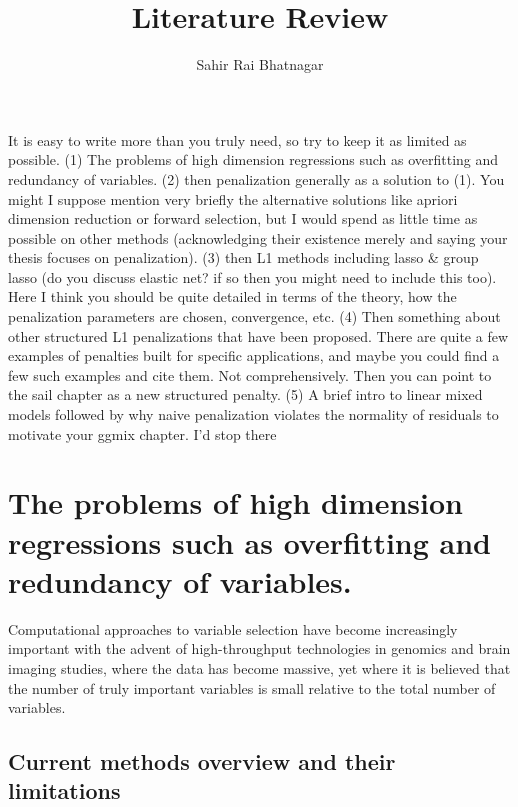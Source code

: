 \documentclass[12pt,letterpaper]{article}
\title{Literature Review}
\author{Sahir Rai Bhatnagar}
\begin{document}
\maketitle
	
It is easy to write more than you truly need, so try to keep it as limited as possible.  
(1) The problems of high dimension regressions such as overfitting and redundancy of variables.  
(2) then  penalization generally as a solution to (1).  
You might I suppose mention very briefly the alternative solutions like apriori dimension reduction or forward selection, but I would spend as little time as possible on other methods (acknowledging their existence merely and saying your thesis focuses on penalization).  
(3) then L1 methods including lasso \& group lasso (do you discuss elastic net? if so then you might need to include this too). Here I think you should be quite detailed in terms of the theory, how the penalization parameters are chosen, convergence, etc. 
(4) Then something about other structured L1 penalizations that have been proposed.  There are quite a few examples of penalties built for specific applications, and maybe you could find a few such examples and cite them. Not comprehensively.  Then you can point to the sail chapter as a new structured penalty.  
(5) A brief intro to linear mixed models followed by why naive penalization violates the normality of residuals to motivate your ggmix chapter.    I'd stop there


\section{The problems of high dimension regressions such as overfitting and redundancy of variables.}
Computational approaches to variable selection have become increasingly important with the advent of high-throughput technologies in genomics and brain imaging studies, where the data has become massive, yet where it is believed that the number of truly important variables is small relative to the total number of variables. 

\subsection{Current methods overview and their limitations} \label{subsec:methods-overview}
\end{document}
